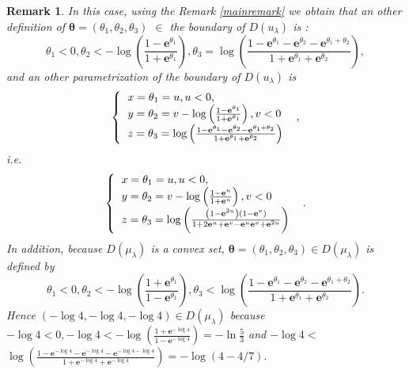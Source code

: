 \documentclass[a4paper,oneside,notitlepage]{article}%
\newtheorem{remark}[theorem]{Remark}
\begin{document}
\begin{remark}
In this case, using the Remark \ref{mainremark} we obtain that an other
definition of $\mathbf{\theta}=\left(  \theta_{1},\theta_{2},\theta
_{3}\right)  $ $\in$ the boundary of $D\left(  u_{\lambda}\right)  $ is :
\[
\theta_{1}<0,\theta_{2}<-\log\left(  \frac{1-\mathbf{e}^{\theta_{1}}%
}{1+\mathbf{e}^{\theta_{1}}}\right)  ,\theta_{3}=\log\left(  \frac
{1-\mathbf{e}^{\theta_{1}}-\mathbf{e}^{\theta_{2}}-\mathbf{e}^{\theta
_{1}+\theta_{2}}}{1+\mathbf{e}^{\theta_{1}}+\mathbf{e}^{\theta_{2}}}\right)
,
\]
and an other parametrization of the boundary of $D\left(  u_{\lambda}\right)
$ is
\[
\left\{
\begin{tabular}
[c]{l}%
$x=\theta_{1}=u,u<0,$\\
$y=\theta_{2}=v-\log\left(  \frac{1-\mathbf{e}^{\theta_{1}}}{1+\mathbf{e}%
^{\theta_{1}}}\right)  ,v<0$\\
$z=\theta_{3}=\log\left(  \frac{1-\mathbf{e}^{\theta_{1}}-\mathbf{e}%
^{\theta_{2}}-\mathbf{e}^{\theta_{1}+\theta_{2}}}{1+\mathbf{e}^{\theta_{1}%
}+\mathbf{e}^{\theta_{2}}}\right)  $%
\end{tabular}
\ \right.  ,
\]
i.e.%
\[
\left\{
\begin{tabular}
[c]{l}%
$x=\theta_{1}=u,u<0,$\\
$y=\theta_{2}=v-\log\left(  \frac{1-\mathbf{e}^{u}}{1+\mathbf{e}^{u}}\right)
,v<0$\\
$z=\theta_{3}=\log\left(  \frac{\left(  1-\mathbf{e}^{2u}\right)  \left(
1-\mathbf{e}^{v}\right)  }{1+2\mathbf{e}^{u}+\mathbf{e}^{v}-\mathbf{e}%
^{u}\mathbf{e}^{v}+\mathbf{e}^{2u}}\right)  $%
\end{tabular}
\ \right.  .
\]
In addition, because $D\left(  \mu_{\lambda}\right)  $ is a convex set,
$\mathbf{\theta}=\left(  \theta_{1},\theta_{2},\theta_{3}\right)  \in D\left(
\mu_{\lambda}\right)  $ is defined by
\[
\theta_{1}<0,\theta_{2}<-\log\left(  \frac{1+\mathbf{e}^{\theta_{1}}%
}{1-\mathbf{e}^{\theta_{1}}}\right)  ,\theta_{3}<\log\left(  \frac
{1-\mathbf{e}^{\theta_{1}}-\mathbf{e}^{\theta_{2}}-\mathbf{e}^{\theta
_{1}+\theta_{2}}}{1+\mathbf{e}^{\theta_{1}}+\mathbf{e}^{\theta_{2}}}\right)
.
\]
Hence $\left(  -\log4,-\log4,-\log4\right)  \in D\left(  \mu_{\lambda}\right)
$ because $-\log4<0,-\log4<-\log\left(  \frac{1+\mathbf{e}^{-\log4}%
}{1-\mathbf{e}^{-\log4}}\right)  =-\ln\frac{5}{3}$ and $-\log4<$ $\log\left(
\frac{1-\mathbf{e}^{-\log4}-\mathbf{e}^{-\log4}-\mathbf{e}^{-\log4-\log4}%
}{1+\mathbf{e}^{-\log4}+\mathbf{e}^{-\log4}}\right)  =-\log\left(
4-4/7\right)  .$
\end{remark}
\end{document}
